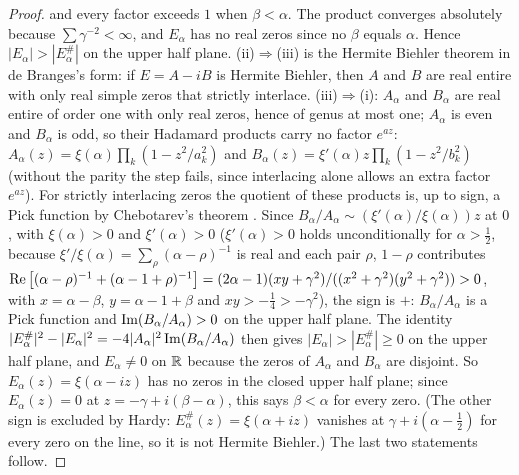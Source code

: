 \begin{proof}
and every factor exceeds $1$ when $\beta<\alpha$. The product converges absolutely because $\sum\gamma^{-2}<\infty$, and $E_\alpha$ has no real zeros since no $\beta$ equals $\alpha$. Hence $|E_\alpha|>|E_\alpha^\#|$ on the upper half plane. (ii)$\Rightarrow$(iii) is the Hermite Biehler theorem in de Branges's form: if $E=A-iB$ is Hermite Biehler, then $A$ and $B$ are real entire with only real simple zeros that strictly interlace. (iii)$\Rightarrow$(i): $A_\alpha$ and $B_\alpha$ are real entire of order one with only real zeros, hence of genus at most one; $A_\alpha$ is even and $B_\alpha$ is odd, so their Hadamard products carry no factor $e^{az}$: $A_\alpha(z)=\xi(\alpha)\prod_k(1-z^2/a_k^2)$ and $B_\alpha(z)=\xi'(\alpha)z\prod_k(1-z^2/b_k^2)$ (without the parity the step fails, since interlacing alone allows an extra factor $e^{az}$). For strictly interlacing zeros the quotient of these products is, up to sign, a Pick function by Chebotarev's theorem \cite{Chebotarev28}. Since $B_\alpha/A_\alpha\sim(\xi'(\alpha)/\xi(\alpha))z$ at $0$, with $\xi(\alpha)>0$ and $\xi'(\alpha)>0$ ($\xi'(\alpha)>0$ holds unconditionally for $\alpha>\frac12$, because $\xi'/\xi(\alpha)=\sum_\rho(\alpha-\rho)^{-1}$ is real and each pair $\rho$, $1-\rho$ contributes $\operatorname{Re}\big[(\alpha-\rho)^{-1}+(\alpha-1+\rho)^{-1}\big]=(2\alpha-1)(xy+\gamma^2)/((x^2+\gamma^2)(y^2+\gamma^2))>0$, with $x=\alpha-\beta$, $y=\alpha-1+\beta$ and $xy>-\frac14>-\gamma^2$), the sign is $+$: $B_\alpha/A_\alpha$ is a Pick function and $\operatorname{Im}(B_\alpha/A_\alpha)>0$ on the upper half plane. The identity $|E_\alpha^\#|^2-|E_\alpha|^2=-4|A_\alpha|^2\operatorname{Im}(B_\alpha/A_\alpha)$ then gives $|E_\alpha|>|E_\alpha^\#|\ge0$ on the upper half plane, and $E_\alpha\ne0$ on $\mathbb{R}$ because the zeros of $A_\alpha$ and $B_\alpha$ are disjoint. So $E_\alpha(z)=\xi(\alpha-iz)$ has no zeros in the closed upper half plane; since $E_\alpha(z)=0$ at $z=-\gamma+i(\beta-\alpha)$, this says $\beta<\alpha$ for every zero. (The other sign is excluded by Hardy: $E_\alpha^\#(z)=\xi(\alpha+iz)$ vanishes at $\gamma+i(\alpha-\frac12)$ for every zero on the line, so it is not Hermite Biehler.) The last two statements follow.
\end{proof}


